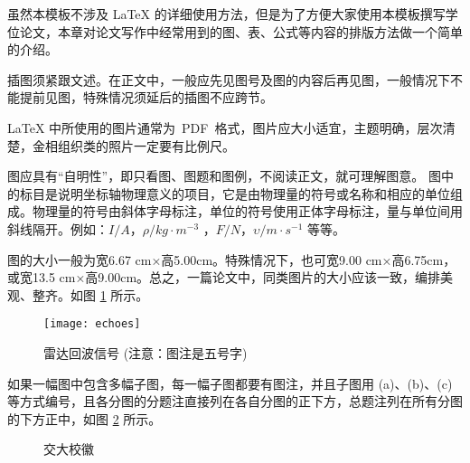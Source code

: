 

虽然本模板不涉及 \LaTeX{} 的详细使用方法，但是为了方便大家使用本模板撰写学位论文，本章对论文写作中经常用到的{\hei 图、表、公式}等内容的排版方法做一个简单的介绍。


插图须紧跟文述。在正文中，一般应先见图号及图的内容后再见图，一般情况下不能提前见图，特殊情况须延后的插图不应跨节。

\LaTeX{} 中所使用的图片通常为~PDF~格式，图片应大小适宜，主题明确，层次清楚，金相组织类的照片一定要有比例尺。

图应具有“自明性”，即只看图、图题和图例，不阅读正文，就可理解图意。
图中的标目是说明坐标轴物理意义的项目，它是由物理量的符号或名称和相应的单位组成。物理量的符号由斜体字母标注，单位的符号使用正体字母标注，量与单位间用斜线隔开。例如：$I / A$，$\rho / kg \cdot m^{-3}$ ，$F/N$，$\upsilon / m \cdot s^{-1} $ 等等。

图的大小一般为宽6.67 cm×高5.00cm。特殊情况下，也可宽9.00 cm×高6.75cm，或宽13.5 cm×高9.00cm。总之，一篇论文中，同类图片的大小应该一致，编排美观、整齐。如图 \ref{fig_ch2_echoes} 所示。
\begin{figure}[!ht]
	\centering
	\texttt{[image: echoes]}
	\caption{雷达回波信号 ({\color{red}注意}：图注是五号字)} \label{fig_ch2_echoes}
\end{figure}


如果一幅图中包含多幅子图，每一幅子图都要有图注，并且子图用 (a)、(b)、(c) 等方式编号，且各分图的分题注直接列在各自分图的正下方，总题注列在所有分图的下方正中，如图 \ref{fig_ch2_badge} 所示。
\begin{figure}[!ht]
	\centering
	 \hfill
	\caption{交大校徽 \label{fig_ch2_badge}}
\end{figure}


